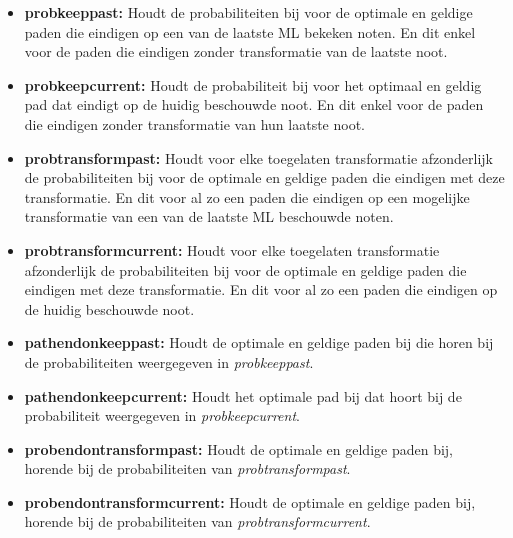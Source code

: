 \begin{itemize}
    \item \textbf{prob\textunderscore keep\textunderscore past:} Houdt de probabiliteiten bij voor de optimale 	en geldige paden die eindigen op een van de laatste ML bekeken noten. En dit 		enkel voor de paden die eindigen zonder transformatie van de laatste noot.
    \item \textbf{prob\textunderscore keep\textunderscore current:} Houdt de probabiliteit bij voor het optimaal en geldig pad dat eindigt op de huidig beschouwde noot. En dit enkel voor de paden die eindigen zonder transformatie van hun laatste noot.
    \item \textbf{prob\textunderscore transform\textunderscore past:} Houdt voor elke toegelaten transformatie afzonderlijk de probabiliteiten bij voor de optimale en geldige paden die eindigen met deze transformatie. En dit voor al zo een paden die eindigen op een mogelijke transformatie van een van de laatste ML beschouwde noten.
    \item \textbf{prob\textunderscore transform\textunderscore current:} Houdt voor elke toegelaten transformatie afzonderlijk de probabiliteiten bij voor de optimale en geldige paden die eindigen met deze transformatie. En dit voor al zo een paden die eindigen op de huidig beschouwde noot.
    \item \textbf{path\textunderscore end\textunderscore on\textunderscore keep\textunderscore past:} Houdt de optimale en geldige paden bij die horen bij de probabiliteiten weergegeven in \textit{prob\textunderscore keep\textunderscore past}.
    \item \textbf{path\textunderscore end\textunderscore on\textunderscore keep\textunderscore current:} Houdt het optimale pad bij dat hoort bij de probabiliteit weergegeven in \textit{prob\textunderscore keep\textunderscore current}.
    \item \textbf{prob\textunderscore end\textunderscore on\textunderscore transform\textunderscore past:} Houdt de optimale en geldige paden bij, horende bij de probabiliteiten van \textit{prob\textunderscore transform\textunderscore past}.
    \item \textbf{prob\textunderscore end\textunderscore on\textunderscore transform\textunderscore current:} Houdt de optimale en geldige paden bij, horende bij de probabiliteiten van \textit{prob\textunderscore transform\textunderscore current}.
\end{itemize}


